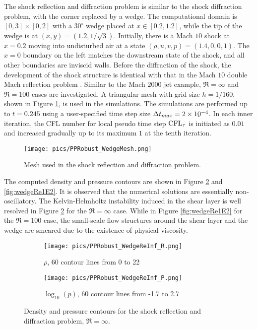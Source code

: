 The shock reflection and diffraction problem \cite{zhang2017positivity} is similar to the shock diffraction problem, with the corner replaced by a wedge. The computational domain is $[0,3]\times[0,2]$ with a $30^\circ$ wedge placed at $x\in[0.2,1.2]$, while the 
tip of the wedge is at $(x,y) = (1.2, 1/\sqrt{3})$. 
Initially, there is a Mach $10$ shock at $x=0.2$ moving into undisturbed air at a state $(\rho, u, v, p) = (1.4,0,0,1)$. The $x=0$ boundary on 
the left matches the downstream state of the shock, and all other boundaries 
are inviscid walls.
Before the diffraction of the shock, the development
of the shock structure is identical with that in the Mach $10$ double Mach reflection problem \cite{woodward1984dmr}. Similar to the Mach $2000$ jet example, $\Re=\infty$ and $\Re=100$ cases 
are investigated. A triangular mesh with grid size $h = 1/160$, shown in Figure \ref{fig:wedgeMesh}, is used in the simulations.
The simulations are performed up to $t=0.245$ using
a user-specified time step size $\mathrm\Delta t_{max}= 2\times10^{-4}$.
In each inner iteration, the CFL number for local pseudo time step $\text{CFL}_\tau$ is initiated as $0.01$ and increased gradually up to its maximum $1$ at the tenth iteration. 

\begin{figure}[htbp]
    \centering
    \texttt{[image: pics/PPRobust\_WedgeMesh.png]}
    \caption{Mesh used in the shock reflection and diffraction problem.}
    \label{fig:wedgeMesh}
\end{figure}

The computed density and pressure contours are shown in Figure \ref{fig:wedgeReInf} and \ref{fig:wedgeRe1E2}. 
It is observed that the numerical solutions are essentially non-oscillatory. The Kelvin-Helmholtz instability induced in the shear layer is well resolved in Figure \ref{fig:wedgeReInf} for the $\Re=\infty$ case. While in Figure  \ref{fig:wedgeRe1E2} for the $\Re=100$ case, the small-scale flow structures around the shear layer and the wedge are smeared  due to the existence of physical viscosity.

\begin{figure}[htbp]
    \centering
    \begin{subfigure}{0.5\textwidth}
        \texttt{[image: pics/PPRobust\_WedgeReInf\_R.png]}
        \caption[]{$\rho$, 60 contour lines from 0 to 22}
    \end{subfigure}\hfill
    \begin{subfigure}{0.5\textwidth}
        \texttt{[image: pics/PPRobust\_WedgeReInf\_P.png]}
        \caption[]{$\log_{10}(p)$, 60 contour lines from -1.7 to 2.7}
    \end{subfigure}
    \caption{Density and pressure contours for the shock reflection and diffraction problem, $\Re=\infty$.}
    \label{fig:wedgeReInf}
\end{figure}


